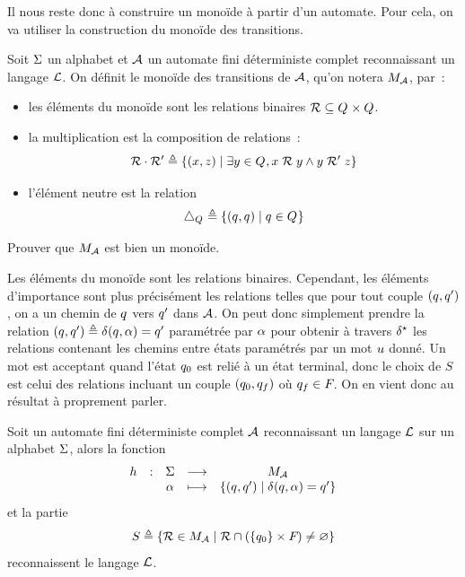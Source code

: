 Il nous reste donc à construire un monoïde à partir d'un automate. Pour cela,
on va utiliser la construction du monoïde des transitions.

\begin{definition}
  Soit $\Sigma$ un alphabet et $\mathcal{A}$ un automate fini déterministe
  complet reconnaissant un langage $\mathcal L$. On définit le monoïde des
  transitions de $\mathcal{A}$, qu'on notera $M_{\mathcal{A}}$, par~:
  \begin{itemize}
  \item les éléments du monoïde sont les relations binaires
    $\mathord{\mathrel{\mathcal{R}}}\subseteq Q_{}\times Q_{}$.
  \item la multiplication est la composition de relations~:
    \[\mathord{\mathrel{\mathcal{R}}}\mathbin{\cdot} \mathord{\mathrel{\mathcal{R}}'} \triangleq
    \left\{ (x,z) \;\middle\vert\; \exists y \in Q_{}, x\mathrel{\mathcal{R}} y\land y\mathrel{\mathcal{R}}' z \right\}\]
  \item l'élément neutre est la relation
    \[\mathord{\mathrel{\triangle}_{Q_{}}} \triangleq \left\{ (q_{},q_{}) \;\middle\vert\; q_{} \in Q_{} \right\}\]
  \end{itemize}
\end{definition}

\begin{exercise}
  Prouver que $M_{\mathcal{A}}$ est bien un monoïde.
\end{exercise}

Les éléments du monoïde sont les relations binaires. Cependant, les éléments
d'importance sont plus précisément les relations telles que pour tout couple
$(q_{},q_{}')$, on a un chemin de $q_{}$ vers $q_{}'$ dans $\mathcal{A}$. On
peut donc simplement prendre la relation
$(q_{},q_{}') \triangleq \delta_{}(q_{},\alpha) = q_{}'$ paramétrée par $\alpha$ pour
obtenir à travers $\delta_{}^{\star}$ les relations contenant les chemins entre états
paramétrés par un mot $u$ donné. Un mot est acceptant quand l'état
$q_{0}$ est relié à un état terminal, donc le choix de $S$ est celui des
relations incluant un couple $(q_{0},q_{f})$ où $q_{f} \in F_{}$. On
en vient donc au résultat à proprement parler.

\begin{proposition}
  Soit un automate fini déterministe complet $\mathcal{A}$ reconnaissant un
  langage $\mathcal L$ sur un alphabet $\Sigma$, alors la fonction
  \[\makeFun{h}{\ABA}{\varMMo_{\varAuA}}{\varla}
            {\compr{(\varq,\varq')}{\trA(\varq,\varla) = \varq'}}\]
  et la partie
  \[S \triangleq \left\{ \mathord{\mathrel{\mathcal{R}}} \in M_{\mathcal{A}} \;\middle\vert\; 
    \mathord{\mathrel{\mathcal{R}}} \cap (\{q_{0}\}\times F_{})\neq\varnothing \right\}\]
  reconnaissent le langage $\mathcal L$.
\end{proposition}


